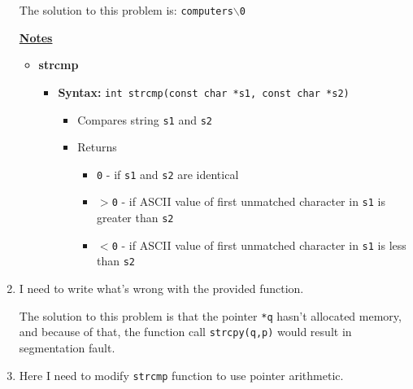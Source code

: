 \documentclass[12pt]{article}
\begin{document}
\begin{enumerate}[1.]
\begin{mdframed}
    \bigskip

    The solution to this problem is: \texttt{computers\color{red}$\backslash$0\color{black}}

    \end{mdframed}


    \bigskip

    \underline{\textbf{Notes}}

    \begin{itemize}
        \item \textbf{strcmp}

        \begin{itemize}
            \item \textbf{Syntax:} \texttt{int strcmp(const char *s1, const char *s2)}

            \begin{itemize}
                \item Compares string \texttt{s1} and \texttt{s2}
                \item Returns

                \begin{itemize}
                    \item \texttt{0} - if \texttt{s1} and \texttt{s2} are identical
                    \item \texttt{$>$0} - if ASCII value of first unmatched character in \texttt{s1} is greater than \texttt{s2}
                    \item \texttt{$<$0} - if ASCII value of first unmatched character in \texttt{s1} is less than \texttt{s2}
                \end{itemize}
            \end{itemize}
        \end{itemize}
    \end{itemize}

    \item

    I need to write what's wrong with the provided function.

    \bigskip

    The solution to this problem is that the pointer \texttt{*q} hasn't
    allocated memory, and because of that, the function call \texttt{strcpy(q,p)} would result in segmentation fault.

    \item

    Here I need to modify \texttt{strcmp} function to use pointer arithmetic.


\end{enumerate}
\end{document}
